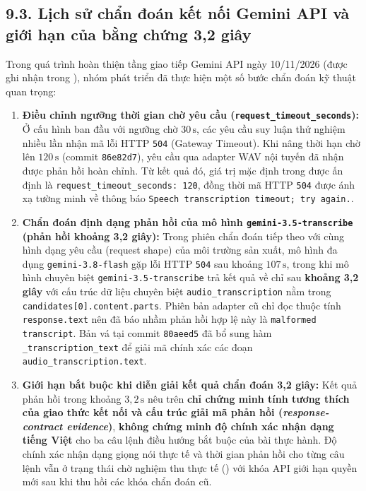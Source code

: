 \subsection*{9.3. Lịch sử chẩn đoán kết nối Gemini API và giới hạn của bằng chứng 3,2 giây}

Trong quá trình hoàn thiện tầng giao tiếp Gemini API ngày 10/11/2026 (được ghi nhận trong ), nhóm phát triển đã thực hiện một số bước chẩn đoán kỹ thuật quan trọng:
\begin{enumerate}[leftmargin=1.2cm]
  \item \textbf{Điều chỉnh ngưỡng thời gian chờ yêu cầu (\texttt{request\_timeout\_seconds}):}
  Ở cấu hình ban đầu với ngưỡng chờ $30\,\text{s}$, các yêu cầu suy luận thử nghiệm nhiều lần nhận mã lỗi HTTP \texttt{504} (Gateway Timeout). Khi nâng thời hạn chờ lên $120\,\text{s}$ (commit \texttt{86e82d7}), yêu cầu qua adapter WAV nội tuyến đã nhận được phản hồi hoàn chỉnh. Từ kết quả đó, giá trị mặc định trong  được ấn định là \texttt{request\_timeout\_seconds: 120}, đồng thời mã HTTP \texttt{504} được ánh xạ tường minh về thông báo \texttt{Speech transcription timeout; try again.}.
  \item \textbf{Chẩn đoán định dạng phản hồi của mô hình \texttt{gemini-3.5-transcribe} (phản hồi khoảng 3,2 giây):}
  Trong phiên chẩn đoán tiếp theo với cùng hình dạng yêu cầu (request shape) của môi trường sản xuất, mô hình đa dụng \texttt{gemini-3.8-flash} gặp lỗi HTTP \texttt{504} sau khoảng $107\,\text{s}$, trong khi mô hình chuyên biệt \texttt{gemini-3.5-transcribe} trả kết quả về chỉ sau \textbf{khoảng 3,2 giây} với cấu trúc dữ liệu chuyên biệt \texttt{audio\_transcription} nằm trong \texttt{candidates[0].content.parts}. Phiên bản adapter cũ chỉ đọc thuộc tính \texttt{response.text} nên đã báo nhầm phản hồi hợp lệ này là \texttt{malformed transcript}. Bản vá tại commit \texttt{80aeed5} đã bổ sung hàm \texttt{\_transcription\_text} để giải mã chính xác các đoạn \texttt{audio\_transcription.text}.
  \item \textbf{Giới hạn bắt buộc khi diễn giải kết quả chẩn đoán 3,2 giây:}
  Kết quả phản hồi trong khoảng $3{,}2\,\text{s}$ nêu trên \textbf{chỉ chứng minh tính tương thích của giao thức kết nối và cấu trúc giải mã phản hồi (\textit{response-contract evidence})}, \textbf{không chứng minh độ chính xác nhận dạng tiếng Việt} cho ba câu lệnh điều hướng bắt buộc của bài thực hành. Độ chính xác nhận dạng giọng nói thực tế và thời gian phản hồi cho từng câu lệnh vẫn ở trạng thái chờ nghiệm thu thực tế (\pending{}) với khóa API giới hạn quyền mới sau khi thu hồi các khóa chẩn đoán cũ.
\end{enumerate}

